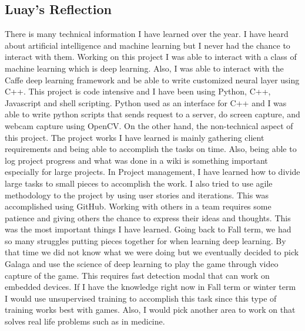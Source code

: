 \documentclass[onecolumn, draftclsnofoot,10pt, compsoc]{IEEEtran}
\begin{document}
\subsection{Luay's Reflection}
There is many technical information I have learned over the year. I have heard about artificial intelligence and machine learning but I never had the chance to interact with them. Working on this project I was able to interact with a class of machine learning which is deep learning. Also, I was able to interact with the Caffe deep learning framework and be able to write customized neural layer using C++. This project is code intensive and I have been using Python, C++, Javascript and shell scripting. Python used as an interface for C++ and I was able to write python scripts that sends request to a server, do screen capture, and webcam capture using OpenCV. On the other hand, the non-technical aspect of this project. \newline
The project works I have learned is mainly gathering client requirements and being able to accomplish the tasks on time. Also, being able to log project progress and what was done in a wiki is something important especially for large projects. \newline
In Project management, I have learned how to divide large tasks to small pieces to accomplish the work. I also tried to use agile methodology to the project by using user stories and iterations. This was accomplished using GitHub.
Working with others in a team requires some patience and giving others the chance to express their ideas and thoughts. This was the most important things I have learned.  \newline
Going back to Fall term, we had so many struggles putting pieces together for when learning deep learning. By that time we did not know what we were doing but we eventually decided to pick Galaga and use the science of deep learning to play the game through video capture of the game. This requires fast detection modal that can work on embedded devices. If I have the knowledge right now in Fall term or winter term I would use unsupervised training to accomplish this task since this type of training works best with games. Also, I would pick another area to work on that solves real life problems such as in medicine.
\end{document}
